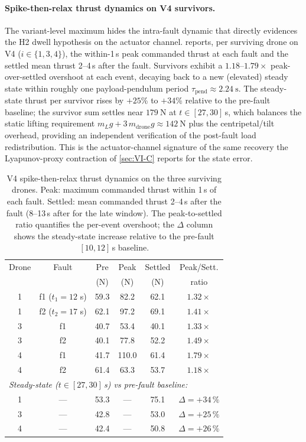 \paragraph{Spike-then-relax thrust dynamics on V4 survivors.} The variant-level maximum hides the intra-fault dynamic that directly evidences the H2 dwell hypothesis on the actuator channel.  reports, per surviving drone on V4 ($i\in\{1,3,4\}$), the within-1\,s peak commanded thrust at each fault and the settled mean thrust 2--4\,s after the fault. Survivors exhibit a $1.18$--$1.79\!\times\!$ peak-over-settled overshoot at each event, decaying back to a new (elevated) steady state within roughly one payload-pendulum period $\tau_{\mathrm{pend}}\!\approx\!\SI{2.24}{\second}$. The steady-state thrust per survivor rises by $+25$\% to $+34$\% relative to the pre-fault baseline; the survivor sum settles near $\SI{179}{\newton}$ at $t\!\in\![27,30]$\,s, which balances the static lifting requirement $m_L g + 3\,m_{\mathrm{drone}} g \!\approx\! \SI{142}{\newton}$ plus the centripetal/tilt overhead, providing an independent verification of the post-fault load redistribution. This is the actuator-channel signature of the same recovery the Lyapunov-proxy contraction of \cref{sec:VI-C} reports for the state error.

\begin{table}[htbp]
  \caption{%
    V4 spike-then-relax thrust dynamics on the three surviving drones. Peak: maximum commanded thrust within 1\,s of each fault. Settled: mean commanded thrust 2--4\,s after the fault (8--13\,s after for the late window). The peak-to-settled ratio quantifies the per-event overshoot; the $\Delta$ column shows the steady-state increase relative to the pre-fault $[10,12]$\,s baseline.%
  }
  \label{tab:thrust-transient}
  \centering
  \small
  \begin{tabular}{cccccc}
    \toprule
    Drone & Fault & Pre & Peak & Settled &
      Peak/Sett. \\
    & & (N) & (N) & (N) & ratio \\
    \midrule
    1 & f1 ($t_1{=}12$ s) & 59.3 &  82.2 & 62.1 & $1.32\times$ \\
    1 & f2 ($t_2{=}17$ s) & 62.1 &  97.2 & 69.1 & $1.41\times$ \\
    3 & f1                 & 40.7 &  53.4 & 40.1 & $1.33\times$ \\
    3 & f2                 & 40.1 &  77.8 & 52.2 & $1.49\times$ \\
    4 & f1                 & 41.7 & 110.0 & 61.4 & $1.79\times$ \\
    4 & f2                 & 61.4 &  63.3 & 53.7 & $1.18\times$ \\
    \midrule
    \multicolumn{6}{l}{\emph{Steady-state ($t\in[27,30]$\,s) vs pre-fault baseline:}} \\
    1 & --- & 53.3 & --- & 75.1 & $\Delta = +34\,\%$ \\
    3 & --- & 42.8 & --- & 53.0 & $\Delta = +25\,\%$ \\
    4 & --- & 42.4 & --- & 50.8 & $\Delta = +26\,\%$ \\
    \bottomrule
  \end{tabular}
\end{table}

